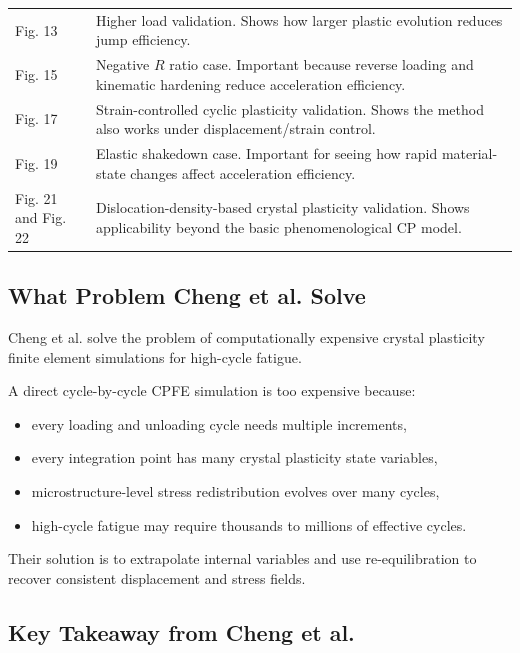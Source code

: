 \documentclass[11pt,a4paper]{article}
\begin{document}
\begin{longtable}{p{}p{}}
Fig. 13 & Higher load validation. Shows how larger plastic evolution reduces jump efficiency. \\

Fig. 15 & Negative $R$ ratio case. Important because reverse loading and kinematic hardening reduce acceleration efficiency. \\

Fig. 17 & Strain-controlled cyclic plasticity validation. Shows the method also works under displacement/strain control. \\

Fig. 19 & Elastic shakedown case. Important for seeing how rapid material-state changes affect acceleration efficiency. \\

Fig. 21 and Fig. 22 & Dislocation-density-based crystal plasticity validation. Shows applicability beyond the basic phenomenological CP model. \\

\bottomrule
\end{longtable}

\subsection{What Problem Cheng et al. Solve}

Cheng et al. solve the problem of computationally expensive crystal plasticity finite element simulations for high-cycle fatigue.

A direct cycle-by-cycle CPFE simulation is too expensive because:

\begin{itemize}
    \item every loading and unloading cycle needs multiple increments,
    \item every integration point has many crystal plasticity state variables,
    \item microstructure-level stress redistribution evolves over many cycles,
    \item high-cycle fatigue may require thousands to millions of effective cycles.
\end{itemize}

Their solution is to extrapolate internal variables and use re-equilibration to recover consistent displacement and stress fields.

\subsection{Key Takeaway from Cheng et al.}
\end{document}
